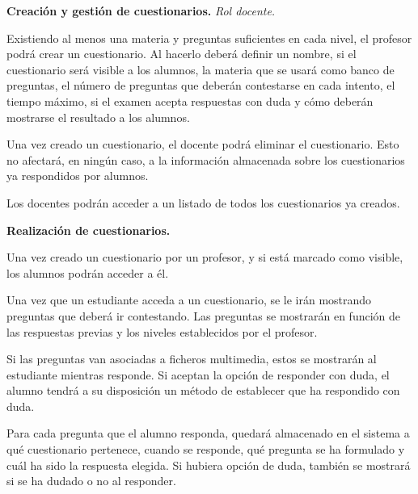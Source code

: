 \begin{rf0}
	\item \textbf{Creación y gestión de cuestionarios.} \textit{Rol docente.}
		\begin{rf0*}
			\item Existiendo al menos una materia y preguntas suficientes en cada nivel, el profesor podrá crear un cuestionario. Al hacerlo deberá definir un nombre, si el cuestionario será visible a los alumnos, la materia que se usará como banco de preguntas, el número de preguntas que deberán contestarse en cada intento, el tiempo máximo, si el examen acepta respuestas con duda y cómo deberán mostrarse el resultado a los alumnos.
			\item Una vez creado un cuestionario, el docente podrá eliminar el cuestionario. Esto no afectará, en ningún caso, a la información almacenada sobre los cuestionarios ya respondidos por alumnos.
			\item Los docentes podrán acceder a un listado de todos los cuestionarios ya creados.
		\end{rf0*}
		
	\item \textbf{Realización de cuestionarios.} 
		\begin{rf0*}
			\item Una vez creado un cuestionario por un profesor, y si está marcado como visible, los alumnos podrán acceder a él.
			\item Una vez que un estudiante acceda a un cuestionario, se le irán mostrando preguntas que deberá ir contestando. Las preguntas se mostrarán en función de las respuestas previas y los niveles establecidos por el profesor.
			\item Si las preguntas van asociadas a ficheros multimedia, estos se mostrarán al estudiante mientras responde. Si aceptan la opción de responder con duda, el alumno tendrá a su disposición un método de establecer que ha respondido con duda.
			\item Para cada pregunta que el alumno responda, quedará almacenado en el sistema a qué cuestionario pertenece, cuando se responde, qué pregunta se ha formulado y cuál ha sido la respuesta elegida. Si hubiera opción de duda, también se mostrará si se ha dudado o no al responder.
		\end{rf0*}
	

\end{rf0}
